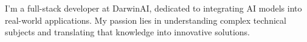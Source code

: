 

\begin{cvparagraph}

I'm a full-stack developer at DarwinAI, dedicated to integrating AI models into real-world applications. My passion lies in understanding complex technical subjects and translating that knowledge into innovative solutions.
\end{cvparagraph}
